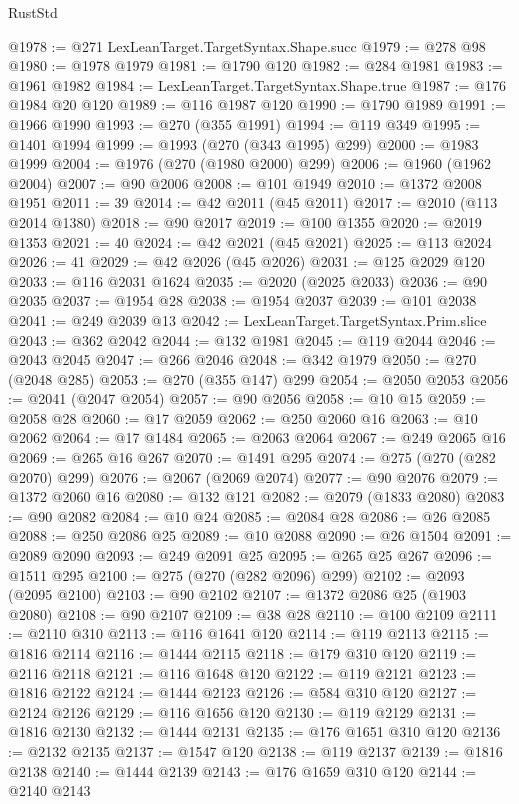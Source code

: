 \begin{lexlean}{RustStd}
\begin{coremodule}
@1978 := @271 LexLeanTarget.TargetSyntax.Shape.succ
@1979 := @278 @98
@1980 := @1978 @1979
@1981 := @1790 @120
@1982 := @284 @1981
@1983 := @1961 @1982
@1984 := LexLeanTarget.TargetSyntax.Shape.true
@1987 := @176 @1984 @20 @120
@1989 := @116 @1987 @120
@1990 := @1790 @1989
@1991 := @1966 @1990
@1993 := @270 (@355 @1991)
@1994 := @119 @349
@1995 := @1401 @1994
@1999 := @1993 (@270 (@343 @1995) @299)
@2000 := @1983 @1999
@2004 := @1976 (@270 (@1980 @2000) @299)
@2006 := @1960 (@1962 @2004)
@2007 := @90 @2006
@2008 := @101 @1949
@2010 := @1372 @2008 @1951
@2011 := 39
@2014 := @42 @2011 (@45 @2011)
@2017 := @2010 (@113 @2014 @1380)
@2018 := @90 @2017
@2019 := @100 @1355
@2020 := @2019 @1353
@2021 := 40
@2024 := @42 @2021 (@45 @2021)
@2025 := @113 @2024
@2026 := 41
@2029 := @42 @2026 (@45 @2026)
@2031 := @125 @2029 @120
@2033 := @116 @2031 @1624
@2035 := @2020 (@2025 @2033)
@2036 := @90 @2035
@2037 := @1954 @28
@2038 := @1954 @2037
@2039 := @101 @2038
@2041 := @249 @2039 @13
@2042 := LexLeanTarget.TargetSyntax.Prim.slice
@2043 := @362 @2042
@2044 := @132 @1981
@2045 := @119 @2044
@2046 := @2043 @2045
@2047 := @266 @2046
@2048 := @342 @1979
@2050 := @270 (@2048 @285)
@2053 := @270 (@355 @147) @299
@2054 := @2050 @2053
@2056 := @2041 (@2047 @2054)
@2057 := @90 @2056
@2058 := @10 @15
@2059 := @2058 @28
@2060 := @17 @2059
@2062 := @250 @2060 @16
@2063 := @10 @2062
@2064 := @17 @1484
@2065 := @2063 @2064
@2067 := @249 @2065 @16
@2069 := @265 @16 @267
@2070 := @1491 @295
@2074 := @275 (@270 (@282 @2070) @299)
@2076 := @2067 (@2069 @2074)
@2077 := @90 @2076
@2079 := @1372 @2060 @16
@2080 := @132 @121
@2082 := @2079 (@1833 @2080)
@2083 := @90 @2082
@2084 := @10 @24
@2085 := @2084 @28
@2086 := @26 @2085
@2088 := @250 @2086 @25
@2089 := @10 @2088
@2090 := @26 @1504
@2091 := @2089 @2090
@2093 := @249 @2091 @25
@2095 := @265 @25 @267
@2096 := @1511 @295
@2100 := @275 (@270 (@282 @2096) @299)
@2102 := @2093 (@2095 @2100)
@2103 := @90 @2102
@2107 := @1372 @2086 @25 (@1903 @2080)
@2108 := @90 @2107
@2109 := @38 @28
@2110 := @100 @2109
@2111 := @2110 @310
@2113 := @116 @1641 @120
@2114 := @119 @2113
@2115 := @1816 @2114
@2116 := @1444 @2115
@2118 := @179 @310 @120
@2119 := @2116 @2118
@2121 := @116 @1648 @120
@2122 := @119 @2121
@2123 := @1816 @2122
@2124 := @1444 @2123
@2126 := @584 @310 @120
@2127 := @2124 @2126
@2129 := @116 @1656 @120
@2130 := @119 @2129
@2131 := @1816 @2130
@2132 := @1444 @2131
@2135 := @176 @1651 @310 @120
@2136 := @2132 @2135
@2137 := @1547 @120
@2138 := @119 @2137
@2139 := @1816 @2138
@2140 := @1444 @2139
@2143 := @176 @1659 @310 @120
@2144 := @2140 @2143

\end{coremodule}
\end{lexlean}
